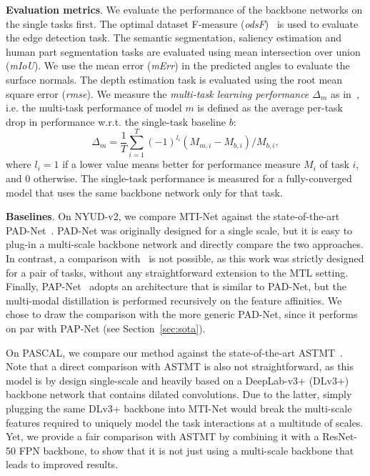 \documentclass[runningheads]{llncs}
\begin{document}
\noindent\textbf{Evaluation metrics}.
We evaluate the performance of the backbone networks on the single tasks first. The optimal dataset F-measure (\textit{odsF})~\cite{martin2004learning} is used to evaluate the edge detection task. The semantic segmentation, saliency estimation and human part segmentation tasks are evaluated using mean intersection over union (\textit{mIoU}). We use the mean error (\textit{mErr}) in the predicted angles to evaluate the surface normals. The depth estimation task is evaluated using the root mean square error (\textit{rmse}). We measure the \textit{multi-task learning performance $\Delta_m$} as in~\cite{maninis2019attentive}, i.e. the multi-task performance of model $m$ is defined as the average per-task drop in performance w.r.t. the single-task baseline $b$:
\begin{equation}
    \Delta_m = \frac{1}{T} \sum_{i=1}^{T} \left(-1\right)^{l_i} \left(M_{m,i} - M_{b,i} \right) / M_{b,i},
\end{equation}
where $l_i = 1$ if a lower value means better for performance measure $M_i$ of task $i$, and 0 otherwise. The single-task performance is measured for a fully-converged model that uses the same backbone network only for that task.

\noindent\textbf{Baselines}.
On NYUD-v2, we compare MTI-Net against the state-of-the-art PAD-Net~\cite{xu2018pad}. PAD-Net was originally designed for a single scale, but it is easy to plug-in a multi-scale backbone network and directly compare the two approaches. In contrast, a comparison with~\cite{zhang2018joint} is not possible, as this work was strictly designed for a pair of tasks, without any straightforward extension to the MTL setting. Finally, PAP-Net~\cite{zhang2019pattern} adopts an architecture that is similar to PAD-Net, but the multi-modal distillation is performed recursively on the feature affinities. We chose to draw the comparison with the more generic PAD-Net, since it performs on par with PAP-Net (see Section~\ref{sec:sota}). 

On PASCAL, we compare our method against the state-of-the-art ASTMT~\cite{maninis2019attentive}. Note that a direct comparison with ASTMT is also not straightforward, as this model is by design single-scale and heavily based on a DeepLab-v3+ (DLv3+) backbone network that contains dilated convolutions. Due to the latter, simply plugging the same DLv3+ backbone into MTI-Net would break the multi-scale features required to uniquely model the task interactions at a multitude of scales. Yet, we provide a fair comparison with ASTMT by combining it with a ResNet-50 FPN backbone, to show that it is not just using a multi-scale backbone that leads to improved results.
\end{document}
